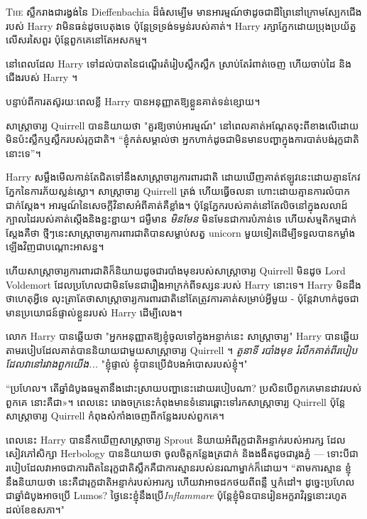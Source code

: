 
\lettrine{T}{he} ស្លឹករាងជារង្វង់នៃ Dieffenbachia ដ៏ធំសម្បើម មានអារម្មណ៍ថាដូចជាដីព្រៃនៅក្រោមស្បែកជើងរបស់ Harry វាមិនធន់ដូចបេតុងទេ ប៉ុន្តែទ្រទ្រង់ទម្ងន់របស់គាត់។ Harry រក្សា​ភ្នែក​ដោយ​ប្រុង​ប្រយ័ត្ន​លើ​សរសៃ​ពួរ ប៉ុន្តែ​ពួកគេ​នៅ​តែ​អសកម្ម។

នៅពេលដែល Harry ទៅដល់បាតនៃជណ្តើរតំរៀបស្លឹកស្លឹក ស្រាប់តែរំពាត់ចេញ ហើយចាប់ដៃ និងជើងរបស់ Harry ។

បន្ទាប់ពីការតស៊ូរយៈពេលខ្លី Harry បានអនុញ្ញាតឱ្យខ្លួនគាត់ទន់ខ្សោយ។

សាស្រ្តាចារ្យ Quirrell បាននិយាយថា "គួរឱ្យចាប់អារម្មណ៍" នៅពេលគាត់អណ្តែតចុះពីខាងលើដោយមិនប៉ះស្លឹកឬស្លឹករបស់រុក្ខជាតិ។ “ខ្ញុំ​កត់​សម្គាល់​ថា អ្នក​ហាក់​ដូច​ជា​មិន​មាន​បញ្ហា​ក្នុង​ការ​បាត់​បង់​រុក្ខជាតិ​នោះ​ទេ”។

Harry សម្លឹងមើលកាន់តែជិតទៅនឹងសាស្រ្តាចារ្យការពារជាតិ ដោយឃើញគាត់ឥឡូវនេះដោយគ្មានកែវភ្នែកនៃការភ័យស្លន់ស្លោ។ សាស្រ្តាចារ្យ Quirrell ត្រង់ ហើយធ្វើចលនា ហោះដោយគ្មានការលំបាកជាក់ស្តែង។ អារម្មណ៍នៃសេចក្តីវិនាសអំពីគាត់គឺខ្លាំង។ ប៉ុន្តែភ្នែករបស់គាត់នៅតែលិចនៅក្នុងលលាដ៍ក្បាលដៃរបស់គាត់ស្តើងនិងខ្ជះខ្ជាយ។ ជម្ងឺមាន \emph{មិនមែន} មិនមែនជាការបំភាន់ទេ ហើយសម្មតិកម្មជាក់ស្តែងគឺថា ថ្មីៗនេះសាស្រ្តាចារ្យការពារជាតិបានសម្លាប់សត្វ unicorn មួយទៀតដើម្បីទទួលបានកម្លាំងឡើងវិញជាបណ្តោះអាសន្ន។

ហើយសាស្ត្រាចារ្យការពារជាតិក៏និយាយដូចជារបាំងមុខរបស់សាស្រ្តាចារ្យ Quirrell មិនដូច Lord Voldemort ដែលប្រហែលជាមិនមែនជារឿងអាក្រក់ពីទស្សនៈរបស់ Harry នោះទេ។ Harry មិន​ដឹង​ថា​ហេតុ​អ្វី​ទេ លុះ​ត្រា​តែ​ថា​សាស្ត្រាចារ្យ​ការពារ​ជាតិ​នៅ​តែ​ត្រូវ​ការ​គាត់​សម្រាប់​អ្វី​មួយ - ប៉ុន្តែ​វា​ហាក់​ដូច​ជា​មាន​ប្រយោជន៍​ផ្ទាល់​ខ្លួន​របស់ Harry ដើម្បី​លេង។

លោក Harry បានឆ្លើយថា "អ្នកអនុញ្ញាតឱ្យខ្ញុំចូលទៅក្នុងអន្ទាក់នេះ សាស្រ្តាចារ្យ" Harry បានឆ្លើយតាមរបៀបដែលគាត់បាននិយាយជាមួយសាស្រ្តាចារ្យ Quirrell ។ \emph{តួនាទី របាំងមុខ រំលឹកគាត់ពីរបៀបដែលវានៅរវាងពួកយើង...} "ខ្ញុំផ្ទាល់ ខ្ញុំបានប្រើដំបងអំបោសរបស់ខ្ញុំ។"

“ប្រហែល។ តើ​ឆ្នាំ​ដំបូង​ធម្មតា​នឹង​ដោះស្រាយ​បញ្ហា​នេះ​ដោយ​របៀប​ណា? ប្រសិន​បើ​ពួក​គេ​មាន​ដាវ​របស់​ពួក​គេ នោះ​គឺ​ជា»។ ពេលនេះ រោងចក្រនេះកំពុងមានទំនោរឆ្ពោះទៅរកសាស្រ្តាចារ្យ Quirrell ប៉ុន្តែសាស្រ្តាចារ្យ Quirrell កំពុងសំកាំងចេញពីកន្លែងរបស់ពួកគេ។

ពេលនេះ Harry បាននឹកឃើញសាស្ត្រាចារ្យ Sprout និយាយអំពីរុក្ខជាតិអន្ទាក់របស់អារក្ស ដែលសៀវភៅសិក្សា Herbology បាននិយាយថា ចូលចិត្តកន្លែងត្រជាក់ និងងងឹតដូចជារូងភ្នំ — ទោះបីជារបៀបដែលវាអាចជាការពិតនៃរុក្ខជាតិស្លឹកគឺជាការស្មានរបស់នរណាម្នាក់ក៏ដោយ។ “តាមការស្មាន ខ្ញុំនឹងនិយាយថា នេះគឺជារុក្ខជាតិអន្ទាក់របស់អារក្ស ហើយវាអាចដកថយពីពន្លឺ ឬកំដៅ។ ដូច្នេះប្រហែលជាឆ្នាំដំបូងអាចប្រើ Lumos? ថ្ងៃនេះខ្ញុំនឹងប្រើ\emph{Inflammare} ប៉ុន្តែខ្ញុំមិនបានរៀនអក្ខរាវិរុទ្ធនោះរហូតដល់ខែឧសភា។"

